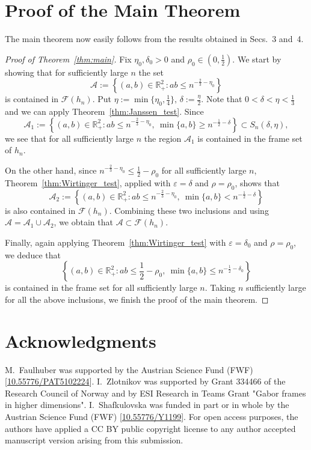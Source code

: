 \documentclass[11pt]{amsart}
\numberwithin{equation}{section}
\newcommand{\R}{{\mathbb R}}
\begin{document}
\section{Proof of the Main Theorem}

The main theorem now easily follows from the results obtained in Secs.~3 and~4.

\begin{proof}[Proof of Theorem~\ref{thm:main}]
Fix $\eta_0,\delta_0>0$ and $\rho_0\in(0,\frac12).$
We start by showing that for sufficiently large $n$ the set
\begin{equation}
\mathcal{A}:=\left\{(a,b)\in\R_+^2:ab\leq n^{-\frac23-\eta_0} \right\}
\end{equation}
is contained in $\mathcal{F}(h_n).$
Put
$\eta:=\min\{\eta_0,\tfrac14\}, \,\delta:=\frac{\eta}{2}.
$
Note that $0<\delta<\eta<\frac{1}{3}$ and we can apply Theorem~\ref{thm:Janssen_test}. Since
\begin{equation}
   \mathcal{A}_1:=\left\{(a,b)\in\R_+^2:
ab\leq n^{-\frac23-\eta_0},\ 
\min\{a,b\}\geq n^{-\frac12-\delta}
\right\}
\subset S_n(\delta,\eta) ,
\end{equation}
we see that 
for all sufficiently large $n$ the region $\mathcal{A}_1$ 
is contained in the frame set of $h_n$.

On the other hand, since
$n^{-\frac23-\eta_0}\leq \frac12-\rho_0$
for all sufficiently large $n$, Theorem~\ref{thm:Wirtinger_test}, applied with
$\varepsilon=\delta$ and $\rho=\rho_0$, shows that
\begin{equation}
\mathcal{A}_2:=\left\{ (a,b)\in\R_+^2: ab\leq n^{-\frac{2}{3}-\eta_0},\  \min\{a,b\}< n^{-\frac{1}{2}-\delta} \right\}    
\end{equation}
is also contained in $\mathcal{F}(h_n)$.
Combining these two inclusions and using $\mathcal{A}=\mathcal{A}_1 \cup \mathcal{A}_2$, we obtain that $\mathcal{A}\subset\mathcal{F}(h_n).$

Finally, again applying Theorem~\ref{thm:Wirtinger_test} with
$\varepsilon=\delta_0$ and $\rho=\rho_0$, we deduce that
\begin{equation}
    \left\{
(a,b)\in\R_+^2:
ab\leq\frac12-\rho_0,\ 
\min\{a,b\}\leq n^{-\frac12-\delta_0}
\right\}
\end{equation}
is contained in the frame set for all sufficiently large $n$. Taking $n$ sufficiently large for all the above inclusions, we finish the proof of the main theorem.
\end{proof}

\section{Acknowledgments}
M.~Faulhuber was supported by the Austrian Science Fund (FWF) [\href{https://doi.org/10.55776/PAT5102224}{10.55776/PAT5102224}]. I.~Zlotnikov was supported by Grant 334466 of the Research Council of Norway and by ESI Research in Teams Grant "Gabor frames in higher dimensions".
I.~Shafkulovska was funded in part or in whole by the Austrian Science Fund (FWF)  [\href{https://doi.org/10.55776/Y1199}{10.55776/Y1199}].
For open access purposes, the authors have applied a CC BY public copyright license to any author accepted manuscript version arising from this submission.
\end{document}
